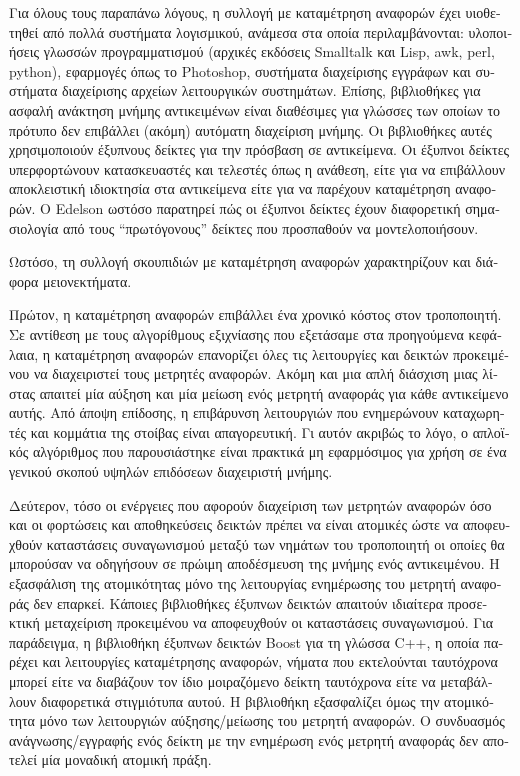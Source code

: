 \begin{greek}
Για όλους τους παραπάνω λόγους, η συλλογή με καταμέτρηση
αναφορών έχει υιοθετηθεί από πολλά συστήματα λογισμικού,
ανάμεσα στα οποία περιλαμβάνονται: υλοποιήσεις γλωσσών
προγραμματισμού (αρχικές εκδόσεις Smalltalk και Lisp, awk,
perl, python), εφαρμογές όπως το Photoshop, συστήματα
διαχείρισης εγγράφων και συστήματα διαχείρισης αρχείων
λειτουργικών συστημάτων. Επίσης, βιβλιοθήκες για ασφαλή
ανάκτηση μνήμης αντικειμένων είναι διαθέσιμες για γλώσσες
των οποίων το πρότυπο δεν επιβάλλει (ακόμη) αυτόματη
διαχείριση μνήμης. Οι βιβλιοθήκες αυτές χρησιμοποιούν
έξυπνους δείκτες για την πρόσβαση σε αντικείμενα. Οι
έξυπνοι δείκτες υπερφορτώνουν κατασκευαστές και τελεστές
όπως η ανάθεση, είτε για να επιβάλλουν αποκλειστική ιδιοκτησία
στα αντικείμενα είτε για να παρέχουν καταμέτρηση αναφορών.
Ο Edelson \cite{DBLP:conf/iwmm/Edelson92} ωστόσο παρατηρεί
πώς οι έξυπνοι δείκτες έχουν διαφορετική σημασιολογία από
τους ``πρωτόγονους'' δείκτες που προσπαθούν να μοντελοποιήσουν.

Ωστόσο, τη συλλογή σκουπιδιών με καταμέτρηση αναφορών
χαρακτηρίζουν και διάφορα μειονεκτήματα.

Πρώτον, η καταμέτρηση αναφορών επιβάλλει ένα χρονικό κόστος
στον τροποποιητή. Σε αντίθεση με τους αλγορίθμους εξιχνίασης
που εξετάσαμε στα προηγούμενα κεφάλαια, η καταμέτρηση αναφορών
επανορίζει όλες τις λειτουργίες  και
 δεικτών προκειμένου να διαχειριστεί τους
μετρητές αναφορών. Ακόμη και μια απλή διάσχιση μιας λίστας
απαιτεί μία αύξηση και μία μείωση ενός μετρητή αναφοράς για
κάθε αντικείμενο αυτής. Από άποψη επίδοσης, η επιβάρυνση
λειτουργιών που ενημερώνουν καταχωρητές και κομμάτια της
στοίβας είναι απαγορευτική. Γι αυτόν ακριβώς το λόγο, ο
απλοϊκός αλγόριθμος που παρουσιάστηκε είναι πρακτικά μη
εφαρμόσιμος για χρήση σε ένα γενικού σκοπού υψηλών επιδόσεων
διαχειριστή μνήμης.

Δεύτερον, τόσο οι ενέργειες που αφορούν διαχείριση των μετρητών
αναφορών όσο και οι φορτώσεις και αποθηκεύσεις δεικτών πρέπει
να είναι ατομικές ώστε να αποφευχθούν καταστάσεις συναγωνισμού
μεταξύ των νημάτων του τροποποιητή οι οποίες θα μπορούσαν να
οδηγήσουν σε πρώιμη αποδέσμευση της μνήμης ενός αντικειμένου.
Η εξασφάλιση της ατομικότητας μόνο της λειτουργίας ενημέρωσης
του μετρητή αναφοράς δεν επαρκεί. Κάποιες βιβλιοθήκες έξυπνων
δεικτών απαιτούν ιδιαίτερα προσεκτική μεταχείριση προκειμένου
να αποφευχθούν οι καταστάσεις συναγωνισμού. Για παράδειγμα,
η βιβλιοθήκη έξυπνων δεικτών Boost για τη γλώσσα C++, η οποία
παρέχει και λειτουργίες καταμέτρησης αναφορών, νήματα που
εκτελούνται ταυτόχρονα μπορεί είτε να διαβάζουν τον ίδιο
μοιραζόμενο δείκτη ταυτόχρονα είτε να μεταβάλλουν διαφορετικά
στιγμιότυπα αυτού. Η βιβλιοθήκη εξασφαλίζει όμως την
ατομικότητα μόνο των λειτουργιών αύξησης/μείωσης του μετρητή
αναφορών. Ο συνδυασμός ανάγνωσης/εγγραφής ενός δείκτη με την
ενημέρωση ενός μετρητή αναφοράς δεν αποτελεί μία μοναδική
ατομική πράξη.


\end{greek}
